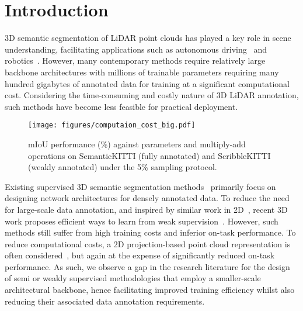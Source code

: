 \documentclass[10pt,twocolumn,letterpaper]{article}
\begin{document}
\section{Introduction}
\vspace{-0.1cm}   


\noindent
3D semantic segmentation of LiDAR point clouds has played a key role in scene understanding, facilitating applications such as autonomous driving~\cite{hu2020randlanet,hou2022pointtovoxel,jaritz2021xmuda,Unal_2022_CVPR,yi2021complete,zhu2021cylindrical, abarghouei19depth} and robotics~\cite{milioto2019rangenet, wu2018squeezesega, wu2019squeezesegv2a,alonso20203dmininet}. However, many contemporary methods require relatively large backbone architectures with millions of trainable parameters requiring  many hundred gigabytes of annotated data for training at a significant computational cost. Considering the time-consuming and costly nature of 3D LiDAR annotation, such methods have become less feasible for practical deployment.  

\begin{figure}[tp]
    \hspace*{-15pt}
    \centering
    \texttt{[image: figures/computaion\_cost\_big.pdf]}
    \caption{mIoU performance (\%) against parameters and multiply-add operations on SemanticKITTI (fully annotated) and ScribbleKITTI (weakly annotated) under the 5\% sampling protocol.
    \vspace{-0.2cm}
    }
    \label{fig:computaion_cost}
\end{figure}


Existing supervised 3D semantic segmentation methods~\cite{wu2018squeezesega,wu2019squeezesegv2a,choy20194d,milioto2019rangenet,tang2020searching,xu2020squeezesegv3,kochanov2020kprnet,zhu2021cylindrical,yan20222dpass} primarily focus on designing network architectures for densely annotated data. To reduce the need for large-scale data annotation, and inspired by similar work in 2D~\cite{chen2021semisupervised, oord2019representation, wang2022semisupervised}, recent 3D work proposes efficient ways to learn from weak supervision~\cite{Unal_2022_CVPR}. However, such methods still suffer from high training costs and inferior on-task performance. To reduce computational costs, a 2D projection-based point cloud representation is often considered~\cite{alonso20203dmininet, cortinhal2020salsanext, kochanov2020kprnet, milioto2019rangenet, wu2018squeezesega, wu2019squeezesegv2a, xu2020squeezesegv3, zhang2020polarneta}, but again at the expense of significantly reduced on-task performance. As such, we observe a gap in the research literature for the design of semi or weakly supervised methodologies that employ a smaller-scale architectural backbone, hence facilitating improved training efficiency whilst also reducing their associated data annotation requirements.
\end{document}
